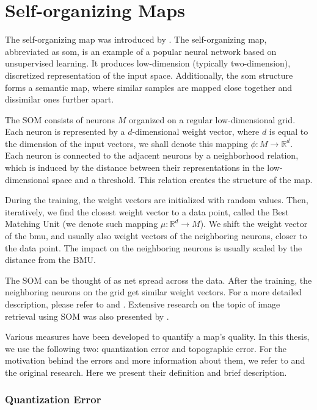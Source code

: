 \section{Self-organizing Maps}
\label{s:som}

The self-organizing map was introduced by \cite{kohonen1982self}. The self-organizing map, abbreviated as \acrshort{som}, is an example of a popular neural network based on unsupervised learning.  It produces low-dimension (typically two-dimension), discretized representation of the input space. Additionally, the \acrlong{som} structure forms a semantic map, where similar samples are mapped close together and dissimilar ones further apart.

The SOM consists of neurons $M$ organized on a regular low-dimensional grid. Each neuron is represented by a $d$-dimensional weight vector, where $d$ is equal to the dimension of the input vectors, we shall denote this mapping $\phi: M \rightarrow \mathbb{R}^d$. Each neuron is connected to the adjacent neurons by a neighborhood relation, which is induced by the distance between their representations in the low-dimensional space and a threshold. This relation creates the structure of the map. 

During the training, the weight vectors are initialized with random values. Then, iteratively, we find the closest weight vector to a data point, called the Best Matching Unit (we denote such mapping $\mu: \mathbb{R}^d \rightarrow M$). We shift the weight vector of the \acrshort{bmu}, and usually also weight vectors of the neighboring neurons, closer to the data point. The impact on the neighboring neurons is usually scaled by the distance from the BMU.

The SOM can be thought of as net spread across the data. After the training, the neighboring neurons on the grid get similar weight vectors. For a more detailed description, please refer to \cite{kohonen1982self} and \cite{kohonen2007kohonen}. Extensive research on the topic of image retrieval using SOM was also presented by \cite{koskela2003interactive}.

Various measures have been developed to quantify a map's quality. In this thesis, we use the following two: quantization error and topographic error. For the motivation behind the errors and more information about them, we refer to \cite{breard2017evaluating} and the original research. Here we present their definition and brief description.

\subsubsection*{Quantization Error}


